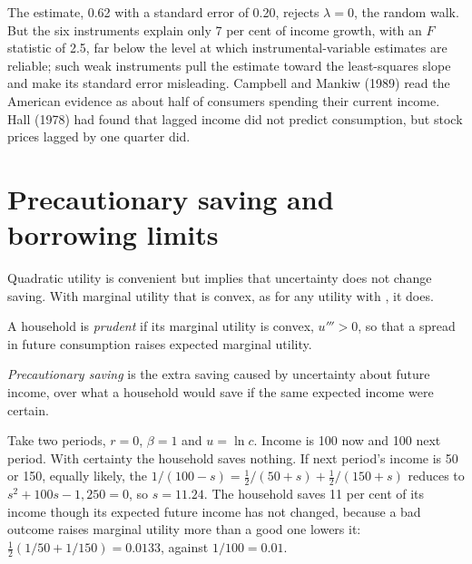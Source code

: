 \label{lst:b2:consumption:lambda}

\label{out:b2:consumption:lambda}

The estimate, 0.62 with a standard error of 0.20, rejects $\lambda = 0$, the random walk. But the six instruments explain only 7 per
cent of income growth, with an $F$ statistic of 2.5, far below the level at which instrumental-variable estimates are
reliable; such weak instruments pull the estimate toward the least-squares slope and make its standard error
misleading. Campbell and Mankiw (1989) read the American evidence as about half
of consumers spending their current income. Hall (1978) had found that lagged income did not predict consumption, but
stock prices lagged by one quarter did.

\section{Precautionary saving and borrowing limits}\label{sec:b2:consumption:precautionary}

Quadratic utility is convenient but implies that uncertainty does not change saving. With marginal utility that is
convex, as for any utility with , it does.

\begin{definition}[Prudence]\label{def:b2:consumption:prudence}
A household is \emph{prudent} if its marginal utility is convex, $u''' > 0$, so that a spread in future
consumption raises expected marginal utility.
\end{definition}

\begin{definition}\label{def:b2:consumption:precautionary}
\emph{Precautionary saving} is the extra saving caused by uncertainty about future income,
over what a household would save if the same expected income were certain.
\end{definition}

Take two periods, $r = 0$, $\beta = 1$ and $u = \ln c$. Income is 100 now and 100 next period. With certainty the household saves nothing. If next period's income
is 50 or 150, equally likely, the  $1/(100 - s) = \tfrac12/(50 + s) + \tfrac12/(150 + s)$ reduces to $s^2 + 100s - 1{,}250 = 0$, so $s = 11.24$. The household saves
11 per cent of its income though its expected future income has not changed, because a bad outcome raises marginal utility
more than a good one lowers it: $\tfrac12(1/50 + 1/150) = 0.0133$, against $1/100 = 0.01$.

